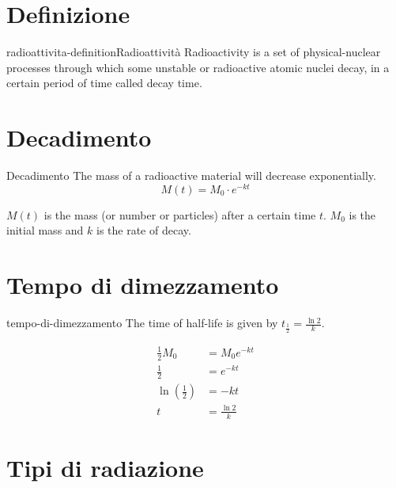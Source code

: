 \documentclass[preview]{standalone}
\begin{document}
\genpage

\section{Definizione}

\begin{snippetdefinition}{radioattivita-definition}{Radioattività}
    Radioactivity is a set of physical-nuclear processes
through which some unstable or radioactive atomic nuclei decay,
in a certain period of time called decay time.
\end{snippetdefinition}


\section{Decadimento}

\begin{snippet}{Decadimento}
    The mass of a radioactive material will decrease exponentially.
    \[
        M(t) = M_0 \cdot e^{-kt}
    \]

    \(M(t)\) is the mass (or number or particles)
    after a certain time \(t\). \(M_0\) is the initial mass
    and \(k\) is the rate of decay.
\end{snippet}

\section{Tempo di dimezzamento}

\begin{snippet}{tempo-di-dimezzamento}
    The time of half-life is given by \(t_\frac{1}{2} = \frac{\ln 2}{k}\).

    \begin{align*}
        \frac{1}{2}M_0 &= M_0 e^{-kt} \\
        \frac{1}{2} &= e^{-kt} \\
        \ln\left(\frac{1}{2}\right) &= -kt \\
        t &= \frac{\ln 2}{k}
    \end{align*}
\end{snippet}

\section{Tipi di radiazione}
\end{document}

